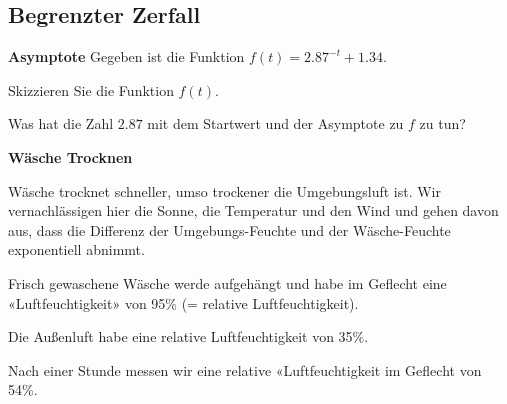 
\subsection{Begrenzter Zerfall}

\bbwActAufgabenNr{} \textbf{Asymptote}
Gegeben ist die Funktion $f(t) = 2.87^{-t} + 1.34$.
\begin{bbwAufgabenBlock}
\item
  Skizzieren Sie die Funktion $f(t)$.
  

  
\item
{}%

  \item Was hat die Zahl $2.87$ mit dem Startwert und der Asymptote zu
    $f$ zu tun? 
\end{bbwAufgabenBlock}

\noTRAINER{}

\platzFuerBerechnungenBisEndeSeite{}



\bbwActAufgabenNr{} \textbf{Wäsche Trocknen}

Wäsche trocknet schneller, umso trockener die Umgebungsluft ist. Wir
vernachlässigen hier die Sonne, die Temperatur und den Wind und gehen
davon aus, dass die Differenz der Umgebungs-Feuchte und der
Wäsche-Feuchte exponentiell abnimmt.

Frisch gewaschene Wäsche werde aufgehängt und habe im Geflecht eine «Luftfeuchtigkeit» von 95\%
(= relative Luftfeuchtigkeit).

Die Außenluft habe eine relative Luftfeuchtigkeit von 35\%. 


Nach einer
Stunde messen wir eine relative «Luftfeuchtigkeit im Geflecht von
54\%.


